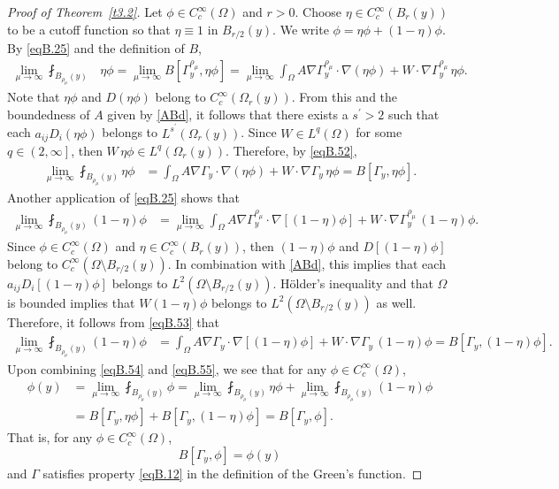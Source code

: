 \documentclass[12pt,reqno]{amsart}
\theoremstyle{plain}
\theoremstyle{definition}
\newenvironment{pf}
{\begin{proof}} {\end{proof}}
\newcommand{\Ga}{\Gamma}
\newcommand{\Om}{\Omega}
\newcommand{\iny}{\infty}
\newcommand{\gr}{\nabla}
\newcommand{\brac}[1]{\left[#1\right]}
\newcommand{\pr}[1]{\left( #1 \right) }
\newcommand{\pb}[1]{\left( #1 \right] }
\begin{document}
\begin{appendix}
\begin{pf}[Proof of Theorem~\ref{t3.2}]
Let $\phi \in C_c^\infty\pr{\Om}$ and $r > 0$.
Choose $\eta \in C^\iny_c\pr{B_r\pr{y}}$ to be a cutoff function so that $\eta \equiv 1$ in $B_{r/2}\pr{y}$.
We write $\phi = \eta \phi + \pr{1 - \eta} \phi$.
By \eqref{eqB.25} and the definition of ${B}$,
\begin{align*}
\lim_{\mu \to \iny} \fint_{B_{\rho_\mu}\pr{y}} &\eta \phi
= \lim_{\mu\to \infty} {B}[\Ga^{\rho_\mu}_y,\eta \phi]
= \lim_{\mu\to \infty} \int_\Om A \gr {\Ga^{\rho_\mu}_y} \cdot \gr \pr{\eta \phi} + W \cdot \gr {\Ga^{\rho_\mu}_y} \, {\eta \phi}.
\end{align*}
Note that $\eta \phi$ and $D\pr{\eta \phi}$ belong to $C^\iny_c\pr{\Om_r\pr{y}}$.  
From this and the boundedness of $A$ given by \eqref{ABd}, it follows that there exists a $s^\prime > 2$ such that each $a_{ij} D_i\pr{\eta \phi}$ belongs to $L^{s^\prime}\pr{\Om_r\pr{y}}$.
Since $W \in L^q\pr{\Om}$ for some $q \in \pb{2, \iny}$, then $W \, \eta \phi \in L^{q}\pr{\Om_r\pr{y}}$.
Therefore, by \eqref{eqB.52},
\begin{align}
\lim_{\mu \to \iny} \fint_{B_{\rho_\mu}\pr{y}} \eta \phi
&= \int_\Om A \gr {\Ga_y} \cdot \gr \pr{\eta \phi} + W \cdot \gr {\Ga_y} \, {\eta \phi}
= {B}[\Ga_{y},\eta \phi] .
\label{eqB.54}
\end{align}
Another application of \eqref{eqB.25} shows that
\begin{align*}
\lim_{\mu \to \iny} \fint_{B_{\rho_\mu}\pr{y}} \pr{1 - \eta} \phi
&= \lim_{\mu\to \infty} \int_\Om A \gr {\Ga^{\rho_\mu}_y} \cdot \gr \brac{\pr{1 -\eta} \phi} + W \cdot \gr {\Ga^{\rho_\mu}_y} \, \pr{1 -\eta} \phi.
\end{align*}
Since $\phi \in C_c^\infty\pr{\Om}$ and $\eta \in C^\iny_c\pr{B_r\pr{y}}$, then $\pr{1 - \eta}\phi$ and $D\brac{\pr{1 - \eta}\phi}$ belong to $C_c^\infty(\Om \setminus B_{r/2}\pr{y})$.
In combination with \eqref{ABd}, this implies that each $a_{ij} D_i\brac{\pr{1 - \eta} \phi}$ belongs to $L^{2}\pr{\Om \setminus B_{r/2}\pr{y}}$.
H\"older's inequality and that $\Om$ is bounded implies that $W \pr{1 - \eta} \phi$ belongs to $L^{2}\pr{\Om \setminus B_{r/2}\pr{y}}$ as well.
Therefore, it follows from \eqref{eqB.53} that
\begin{align}
\lim_{\mu \to \iny} \fint_{B_{\rho_\mu}\pr{y}} \pr{1 - \eta} \phi
&= \int_\Om A \gr {\Ga_y} \cdot \gr \brac{\pr{1 -\eta} \phi} + W \cdot \gr {\Ga_y} \, \pr{1 -\eta} \phi
= {B}[\Ga_{y},\pr{1-\eta} \phi] .
\label{eqB.55}
\end{align}
Upon combining \eqref{eqB.54} and \eqref{eqB.55}, we see that for any $\phi \in C^\iny_c\pr{\Om}$,
\begin{align*}
\phi\pr{y}
&= \lim_{\mu \to \iny} \fint_{B_{\rho_\mu}\pr{y}} \phi
= \lim_{\mu \to \iny} \fint_{B_{\rho_\mu}\pr{y}} \eta \phi
+ \lim_{\mu \to \iny} \fint_{B_{\rho_\mu}\pr{y}} \pr{1 - \eta} \phi \nonumber \\
&= {B}[\Ga_{y},\eta \phi] 
+  {B}[\Ga_{y},\pr{1-\eta} \phi] 
=  {B}[\Ga_{y}, \phi].
\end{align*}
That is, for any $\phi \in C_c^\infty\pr{\Om}$, 
$${B}\brac{\Ga_y, \phi}= \phi\pr{y}$$
and $\Ga$ satisfies property \eqref{eqB.12} in the definition of the Green's function.


\end{pf}
\end{appendix}
\end{document}

